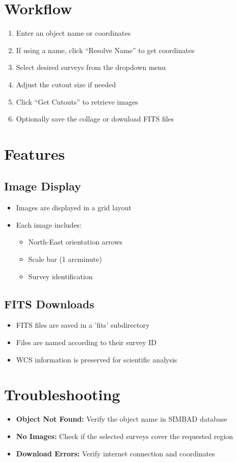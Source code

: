 \documentclass{article}
\begin{document}
\section{Workflow}
\begin{enumerate}
    \item Enter an object name or coordinates
    \item If using a name, click ``Resolve Name'' to get coordinates
    \item Select desired surveys from the dropdown menu
    \item Adjust the cutout size if needed
    \item Click ``Get Cutouts'' to retrieve images
    \item Optionally save the collage or download FITS files
\end{enumerate}

\section{Features}
\subsection{Image Display}
\begin{itemize}
    \item Images are displayed in a grid layout
    \item Each image includes:
        \begin{itemize}
            \item North-East orientation arrows
            \item Scale bar (1 arcminute)
            \item Survey identification
        \end{itemize}
\end{itemize}

\subsection{FITS Downloads}
\begin{itemize}
    \item FITS files are saved in a 'fits' subdirectory
    \item Files are named according to their survey ID
    \item WCS information is preserved for scientific analysis
\end{itemize}

\section{Troubleshooting}
\begin{itemize}
    \item \textbf{Object Not Found:} Verify the object name in SIMBAD database
    \item \textbf{No Images:} Check if the selected surveys cover the requested region
    \item \textbf{Download Errors:} Verify internet connection and coordinates
\end{itemize}
\end{document}
